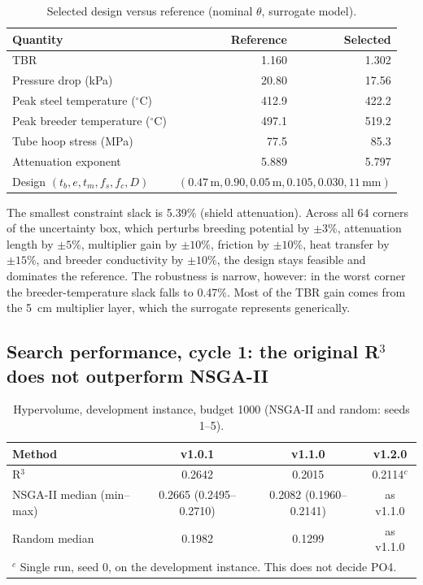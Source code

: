 \documentclass[11pt]{article}
\begin{document}
\begin{table}[h]
\centering
\caption{Selected design versus reference (nominal $\theta$, surrogate model).}
\label{tab:cand}
\begin{tabular}{lrr}
\toprule
Quantity & Reference & Selected \\
\midrule
TBR & 1.160 & 1.302 \\
Pressure drop (kPa) & 20.80 & 17.56 \\
Peak steel temperature ($^\circ$C) & 412.9 & 422.2 \\
Peak breeder temperature ($^\circ$C) & 497.1 & 519.2 \\
Tube hoop stress (MPa) & 77.5 & 85.3 \\
Attenuation exponent & 5.889 & 5.797 \\
\midrule
Design $(t_b, e, t_m, f_s, f_c, D)$ & \multicolumn{2}{r}{$(0.47\,\text{m}, 0.90, 0.05\,\text{m}, 0.105, 0.030, 11\,\text{mm})$} \\
\bottomrule
\end{tabular}
\end{table}

The smallest constraint slack is 5.39\% (shield attenuation). Across all 64 corners of the
uncertainty box, which perturbs breeding potential by $\pm3\%$, attenuation length by $\pm5\%$,
multiplier gain by $\pm10\%$, friction by $\pm10\%$, heat transfer by $\pm15\%$, and breeder
conductivity by $\pm10\%$, the design stays feasible and dominates the reference. The robustness is
narrow, however: in the worst corner the breeder-temperature slack falls to 0.47\%. Most of the
TBR gain comes from the 5~cm multiplier layer, which the surrogate represents generically.

\subsection{Search performance, cycle 1: the original R$^3$ does not outperform NSGA-II}

\begin{table}[h]
\centering
\caption{Hypervolume, development instance, budget 1000 (NSGA-II and random: seeds 1--5).}
\label{tab:hv}
\begin{tabular}{lccc}
\toprule
Method & v1.0.1 & v1.1.0 & v1.2.0 \\
\midrule
R$^3$ & 0.2642 & 0.2015 & 0.2114$^c$ \\
NSGA-II median (min--max) & 0.2665 (0.2495--0.2710) & 0.2082 (0.1960--0.2141) & as v1.1.0 \\
Random median & 0.1982 & 0.1299 & as v1.1.0 \\
\bottomrule
\multicolumn{4}{l}{\footnotesize $^c$ Single run, seed 0, on the development instance. This does not decide PO4.}
\end{tabular}
\end{table}
\end{document}
